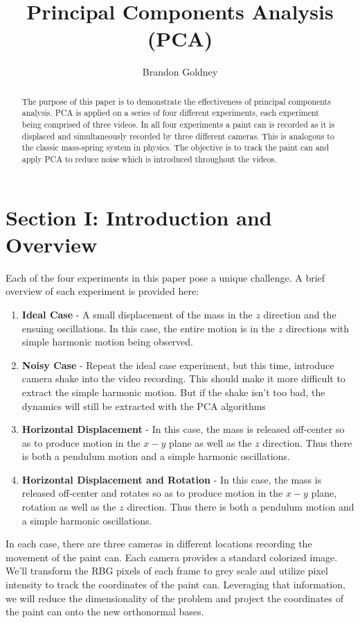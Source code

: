 \documentclass{cup-pan}
\title{Principal Components Analysis (PCA)}
\author[1]{\normalsize Brandon Goldney}
\affil[1]{Department of Applied Mathematics, University of Washington, Email: \url{Goldney@uw.edu}}
\begin{document}
\maketitle

\begin{abstract}
	The purpose of this paper is to demonstrate the effectiveness of principal components analysis.  PCA is applied on a series of four  different experiments, each experiment being comprised of three videos. In all four experiments a paint can is recorded as it is displaced and  simultaneously recorded by three different cameras. This is analogous to the classic mass-spring system in physics.  The objective is to track the paint can and apply PCA to reduce noise which is introduced throughout the videos.  
\end{abstract}

\section{Section I: Introduction and Overview}
Each of the four experiments in this paper pose a unique challenge. A brief overview of each experiment is provided here:  
\begin{enumerate}
	\item \textbf{ Ideal Case} - A small displacement of the mass in the $z$ direction and the ensuing oscillations. In this case, the entire motion is in the $z$ directions with simple harmonic motion being observed.
	\item \textbf{Noisy Case} -  Repeat the ideal case experiment, but this time, introduce camera shake into the video recording. This should make it more difficult to extract the simple harmonic motion. But if the shake isn’t too bad, the dynamics will still be extracted with the PCA algorithms
	\item \textbf{Horizontal Displacement} - In this case, the mass is released off-center so as to produce motion in the $x−y$ plane as well as the $z$ direction. Thus there is both a pendulum motion and a simple harmonic oscillations.
	\item \textbf{Horizontal Displacement and Rotation} - In this case, the mass is released off-center and rotates so as to produce motion in the $x−y$ plane, rotation as well as the $z$ direction. Thus there is both a pendulum motion and a simple harmonic oscillations.
\end{enumerate}

\vskip 0.1in
\noindent
In each case, there are three cameras in different locations recording the movement of the paint can. Each camera provides a standard colorized image.  We'll transform the RBG pixels of each frame to grey scale and utilize pixel intensity to track the coordinates of the paint can.  Leveraging that information, we will reduce the dimensionality of the problem and project the coordinates of the paint can onto the new orthonormal bases.
\end{document}
